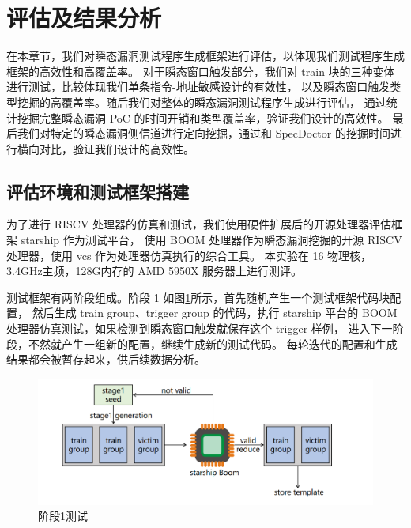 \cleardoublepage
\section{评估及结果分析}

在本章节，我们对瞬态漏洞测试程序生成框架进行评估，以体现我们测试程序生成框架的高效性和高覆盖率。
对于瞬态窗口触发部分，我们对 train 块的三种变体进行测试，比较体现我们单条指令-地址敏感设计的有效性，
以及瞬态窗口触发类型挖掘的高覆盖率。随后我们对整体的瞬态漏洞测试程序生成进行评估，
通过统计挖掘完整瞬态漏洞 PoC 的时间开销和类型覆盖率，验证我们设计的高效性。
最后我们对特定的瞬态漏洞侧信道进行定向挖掘，通过和 SpecDoctor 的挖掘时间进行横向对比，验证我们设计的高效性。\par

\subsection{评估环境和测试框架搭建}

为了进行 RISCV 处理器的仿真和测试，我们使用硬件扩展后的开源处理器评估框架 starship 作为测试平台，
使用 BOOM 处理器作为瞬态漏洞挖掘的开源 RISCV 处理器，使用 vcs 作为处理器仿真执行的综合工具。
本实验在 16 物理核，3.4GHz主频，128G内存的 AMD 5950X 服务器上进行测评。\par

测试框架有两阶段组成。阶段 1 如图\ref{paper:stage1-test}所示，首先随机产生一个测试框架代码块配置，
然后生成 train group、trigger group 的代码，执行 starship 平台的
BOOM 处理器仿真测试，如果检测到瞬态窗口触发就保存这个 trigger 样例，
进入下一阶段，不然就产生一组新的配置，继续生成新的测试代码。
每轮迭代的配置和生成结果都会被暂存起来，供后续数据分析。\par

\begin{figure}[!h]
    \centering
    \includegraphics[width=\linewidth]{figure/paper/stage1-test.png}
    \caption{阶段1测试}
    \label{paper:stage1-test}
\end{figure}

